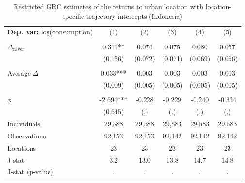 \begin{table}[htbp] \centering \begin{threeparttable}
 \caption{Restricted GRC estimates of the returns to urban location with location-specific trajectory intercepts (Indonesia)} 
 \label{tab:verdier_robust_twostep_IDN_consumption_urban_unb} 
\begin{tabular}{l ccccc} \toprule  \textbf{Dep. var:}  log(consumption) 
                    &\multicolumn{1}{c}{(1)}   &\multicolumn{1}{c}{(2)}   &\multicolumn{1}{c}{(3)}   &\multicolumn{1}{c}{(4)}   &\multicolumn{1}{c}{(5)}   \\
                    &               &               &               &               &               \\
\addlinespace
$\Delta_{\text{never}}$&       0.311** &       0.074   &       0.075   &       0.080   &       0.057   \\
                    &     (0.156)   &     (0.072)   &     (0.071)   &     (0.069)   &     (0.066)   \\
                    &               &               &               &               &               \\
\addlinespace
Average $\Delta$    &       0.033***&       0.003   &       0.003   &       0.003   &       0.003   \\
                    &     (0.009)   &     (0.005)   &     (0.005)   &     (0.005)   &     (0.005)   \\
                    &               &               &               &               &               \\
\addlinespace
$\phi$              &      -2.694***&      -0.228   &      -0.229   &      -0.240   &      -0.334   \\
                    &     (0.645)   &         (.)   &         (.)   &         (.)   &         (.)   \\
\addlinespace
Individuals         &      29,588   &      29,588   &      29,583   &      29,583   &      29,583   \\
Observations        &      92,153   &      92,153   &      92,142   &      92,142   &      92,142   \\
Locations           &          23   &          23   &          23   &          23   &          23   \\
J-stat              &         3.2   &        13.0   &        13.8   &        14.7   &        14.8   \\
J-stat (p-value)    &           .   &           .   &           .   &           .   &           .   \\

\end{tabular}
\end{threeparttable}
\end{table}
